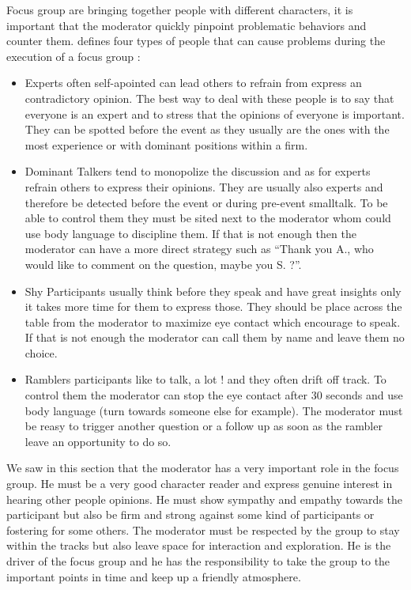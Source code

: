 \documentclass[10pt]{report}
\begin{document}
Focus group are bringing together people with different characters, it is important that the moderator quickly pinpoint problematic behaviors and counter them. \autocite{Krueger2000} defines four types of people that can cause problems during the execution of a focus group :
\begin{itemize}
\item Experts often self-apointed can lead others to refrain from express an contradictory opinion. The best way to deal with these people is to say that everyone is an expert and to stress that the opinions of everyone is important. They can be spotted before the event as they usually are the ones with the most experience or with dominant positions within a firm.
\item Dominant Talkers tend to monopolize the discussion and as for experts refrain others to express their opinions. They are usually also experts and therefore be detected before the event or during pre-event smalltalk. To be able to control them they must be sited next to the moderator whom could use body language to discipline them. If that is not enough then the moderator can have a more direct strategy such as \enquote{Thank you A., who would like to comment on the question, maybe you S. ?}.
\item Shy Participants usually think before they speak and have great insights only it takes more time for them to express those. They should be place across the table from the moderator to maximize eye contact which encourage to speak. If that is not enough the moderator can call them by name and leave them no choice.
\item Ramblers participants like to talk, a lot ! and they often drift off track. To control them the moderator can stop the eye contact after 30 seconds and use body language (turn towards someone else for example). The moderator must be reasy to trigger another question or a follow up as soon as the rambler leave an opportunity to do so.
\end{itemize}


We saw in this section that the moderator has a very important role in the focus group. He must be a very good character reader and express genuine interest in hearing other people opinions. He must show sympathy and empathy towards the participant but also be firm and strong against some kind of participants or fostering for some others. The moderator must be respected by the group to stay within the tracks but also leave space for interaction and exploration. He is the driver of the focus group and he has the responsibility to take the group to the important points in time and keep up a friendly atmosphere.
\end{document}
